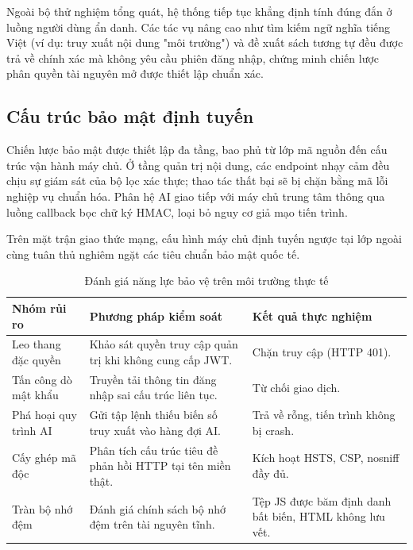Ngoài bộ thử nghiệm tổng quát, hệ thống tiếp tục khẳng định tính đúng đắn ở luồng người dùng ẩn danh. Các tác vụ nâng cao như tìm kiếm ngữ nghĩa tiếng Việt (ví dụ: truy xuất nội dung "môi trường") và đề xuất sách tương tự đều được trả về chính xác mà không yêu cầu phiên đăng nhập, chứng minh chiến lược phân quyền tài nguyên mở được thiết lập chuẩn xác.

\subsection{Cấu trúc bảo mật định tuyến}

Chiến lược bảo mật được thiết lập đa tầng, bao phủ từ lớp mã nguồn đến cấu trúc vận hành máy chủ. Ở tầng quản trị nội dung, các endpoint nhạy cảm đều chịu sự giám sát của bộ lọc xác thực; thao tác thất bại sẽ bị chặn bằng mã lỗi nghiệp vụ chuẩn hóa. Phân hệ AI giao tiếp với máy chủ trung tâm thông qua luồng callback bọc chữ ký HMAC, loại bỏ nguy cơ giả mạo tiến trình.

Trên mặt trận giao thức mạng, cấu hình máy chủ định tuyến ngược tại lớp ngoài cùng tuân thủ nghiêm ngặt các tiêu chuẩn bảo mật quốc tế.

\begin{table}[H]
\centering
\small
\renewcommand{\arraystretch}{1.3}
\begin{tabularx}{\textwidth}{|p{4.2cm}|X|p{3.2cm}|}
\hline
\textbf{Nhóm rủi ro} & \textbf{Phương pháp kiểm soát} & \textbf{Kết quả thực nghiệm} \\
\hline
Leo thang đặc quyền & Khảo sát quyền truy cập quản trị khi không cung cấp JWT. & Chặn truy cập (HTTP 401). \\
\hline
Tấn công dò mật khẩu & Truyền tải thông tin đăng nhập sai cấu trúc liên tục. & Từ chối giao dịch. \\
\hline
Phá hoại quy trình AI & Gửi tập lệnh thiếu biến số truy xuất vào hàng đợi AI. & Trả về rỗng, tiến trình không bị crash. \\
\hline
Cấy ghép mã độc & Phân tích cấu trúc tiêu đề phản hồi HTTP tại tên miền thật. & Kích hoạt HSTS, CSP, nosniff đầy đủ. \\
\hline
Tràn bộ nhớ đệm & Đánh giá chính sách bộ nhớ đệm trên tài nguyên tĩnh. & Tệp JS được băm định danh bất biến, HTML không lưu vết. \\
\hline
\end{tabularx}
\caption{Đánh giá năng lực bảo vệ trên môi trường thực tế}
\label{tab:security_smoke_test}
\end{table}

